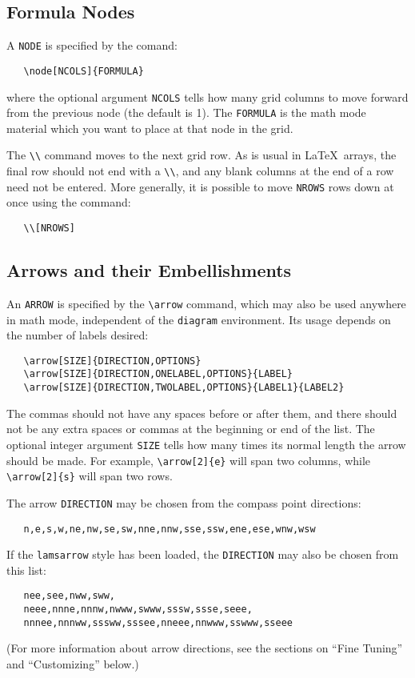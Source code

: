 \subsection{Formula Nodes}

A \verb"NODE" is specified by the comand:
\begin{verbatim}
   \node[NCOLS]{FORMULA}
\end{verbatim}
where the optional argument \verb"NCOLS" tells how many grid columns 
to move forward from the previous node (the default is 1).  The 
\verb"FORMULA" is the math mode material which you want to place at 
that node in the grid.

The \verb"\\" command moves to the next grid row.  As is usual in 
\LaTeX\ arrays, the final row should not end with a \verb"\\", and 
any blank columns at the end of a row need not be entered.  More 
generally, it is possible to move \verb"NROWS" rows down at once 
using the command:
\begin{verbatim}
   \\[NROWS]
\end{verbatim}

\subsection{Arrows and their Embellishments}

An \verb"ARROW" is specified by the \verb"\arrow" command, which may 
also be used anywhere in math mode, independent of the
\verb"diagram" environment.  Its usage depends on the number of 
labels desired:
\begin{verbatim}
   \arrow[SIZE]{DIRECTION,OPTIONS}
   \arrow[SIZE]{DIRECTION,ONELABEL,OPTIONS}{LABEL}
   \arrow[SIZE]{DIRECTION,TWOLABEL,OPTIONS}{LABEL1}{LABEL2}
\end{verbatim}
The commas should not have any spaces before or after them, and there 
should not be any extra spaces or commas at the beginning or end of 
the list.  The optional integer argument \verb"SIZE" tells how many 
times its normal length the arrow should be made.  For example, 
\verb"\arrow[2]{e}" will span two columns, while \verb"\arrow[2]{s}" 
will span two rows.

The arrow \verb"DIRECTION" may be chosen from the compass point 
directions:  
\begin{verbatim}
   n,e,s,w,ne,nw,se,sw,nne,nnw,sse,ssw,ene,ese,wnw,wsw
\end{verbatim}
If the \verb"lamsarrow" style has been loaded, the \verb"DIRECTION"
may also be chosen from this list:
\begin{verbatim}
   nee,see,nww,sww,
   neee,nnne,nnnw,nwww,swww,sssw,ssse,seee,
   nnnee,nnnww,sssww,sssee,nneee,nnwww,sswww,sseee
\end{verbatim}
(For more information about arrow directions, see the sections
on ``Fine Tuning'' and ``Customizing'' below.)

